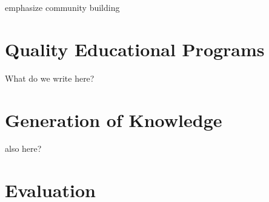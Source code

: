 \documentclass[12pt]{article}
\begin{document}

emphasize community building

\section{Quality Educational Programs}

What do we write here?

\section{Generation of Knowledge}

also here?

\section{Evaluation}

\end{document}
